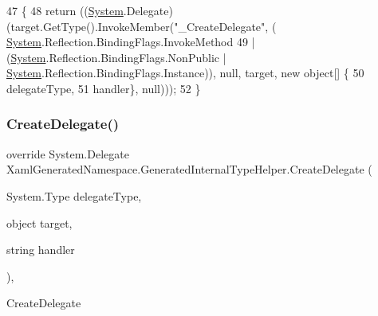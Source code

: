 \begin{DoxyCode}
47                                                                                                            
              \{
48             \textcolor{keywordflow}{return} ((\hyperlink{namespaceSystem}{System}.Delegate)(target.GetType().InvokeMember(\textcolor{stringliteral}{"\_CreateDelegate"}, (
      \hyperlink{namespaceSystem}{System}.Reflection.BindingFlags.InvokeMethod 
49                             | (\hyperlink{namespaceSystem}{System}.Reflection.BindingFlags.NonPublic | 
      \hyperlink{namespaceSystem}{System}.Reflection.BindingFlags.Instance)), null, target, \textcolor{keyword}{new} \textcolor{keywordtype}{object}[] \{
50                         delegateType,
51                         handler\}, null)));
52         \}
\end{DoxyCode}
\mbox{\label{classXamlGeneratedNamespace_1_1GeneratedInternalTypeHelper_a8ec4c37e82d9f4e867e9655f4eac3a78}} 
\subsubsection{\texorpdfstring{Create\+Delegate()}{CreateDelegate()}\hspace{0.1cm}{\footnotesize\ttfamily [3/3]}}
{\footnotesize\ttfamily override System.\+Delegate Xaml\+Generated\+Namespace.\+Generated\+Internal\+Type\+Helper.\+Create\+Delegate (\begin{DoxyParamCaption}\item[{System.\+Type}]{delegate\+Type,  }\item[{object}]{target,  }\item[{string}]{handler }\end{DoxyParamCaption})\hspace{0.3cm}{\ttfamily [inline]}, {\ttfamily [protected]}}



Create\+Delegate 


